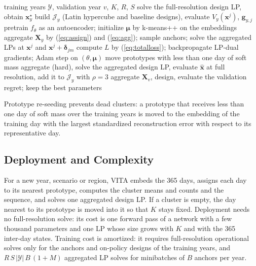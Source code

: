 \documentclass[journal]{IEEEtran}
\begin{document}
\begin{algorithm}[!t]
\caption{Training of VITA}\label{alg:vita}
\footnotesize
\begin{algorithmic}[1]
\Require training years $\mathcal{Y}$, validation year $v$, $K$, $R$, $S$
 solve the full-resolution design LP, obtain $\bm{x}^{\star}_y$ \EndFor
{} build $\mathcal{J}_y$ (Latin hypercube and baseline designs), evaluate $V_y(\bm{x}^{j})$, $\bm{g}_{y,j}$ \EndFor
\State pretrain $f_{\theta}$ as an autoencoder; initialize $\bm{\mu}$ by k-means++ on the embeddings
     aggregate $\bm{X}_y$ by (\ref{eq:assign}) and (\ref{eq:agg}); sample anchors; solve the aggregated LPs at $\bm{x}^{j}$ and $\bm{x}^{j}+\bm{\delta}_{jm}$ \EndFor
    \State compute $L$ by (\ref{eq:totalloss}); backpropagate LP-dual gradients; Adam step on $(\theta,\bm{\mu})$
    \State move prototypes with less than one day of soft mass
  \EndFor
   aggregate (hard), solve the aggregated design LP, evaluate $\hat{\bm{x}}$ at full resolution, add it to $\mathcal{J}_y$ with $\rho=3$ \EndFor
  \State aggregate $\bm{X}_v$, design, evaluate the validation regret; keep the best parameters
\EndFor
\end{algorithmic}
\end{algorithm}

Prototype re-seeding prevents dead clusters: a prototype that receives less than one day of soft mass over the training years is moved to the embedding of the training day with the largest standardized reconstruction error with respect to its representative day.

\subsection{Deployment and Complexity}
For a new year, scenario or region, VITA embeds the 365 days, assigns each day to its nearest prototype, computes the cluster means and counts and the sequence, and solves one aggregated design LP. If a cluster is empty, the day nearest to its prototype is moved into it so that $K$ stays fixed. Deployment needs no full-resolution solve: its cost is one forward pass of a network with a few thousand parameters and one LP whose size grows with $K$ and with the 365 inter-day states. Training cost is amortized: it requires full-resolution operational solves only for the anchors and on-policy designs of the training years, and $R\,S\,|\mathcal{Y}|\,B\,(1+M)$ aggregated LP solves for minibatches of $B$ anchors per year.
\end{document}
